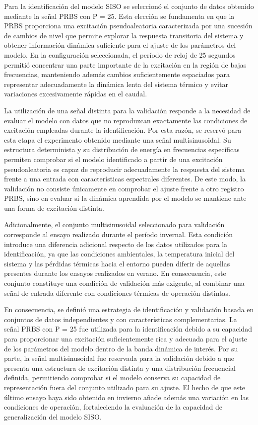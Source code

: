 \documentclass[11pt]{report}
\begin{document}
Para la identificación del modelo SISO se seleccionó el conjunto de datos obtenido mediante la señal PRBS con P = 25. Esta elección se fundamenta en que la PRBS proporciona una excitación pseudoaleatoria caracterizada por una sucesión de cambios de nivel que permite explorar la respuesta transitoria del sistema y obtener información dinámica suficiente para el ajuste de los parámetros del modelo. En la configuración seleccionada, el período de reloj de 25 segundos permitió concentrar una parte importante de la excitación en la región de bajas frecuencias, manteniendo además cambios suficientemente espaciados para representar adecuadamente la dinámica lenta del sistema térmico y evitar variaciones excesivamente rápidas en el caudal.

La utilización de una señal distinta para la validación responde a la necesidad de evaluar el modelo con datos que no reproduzcan exactamente las condiciones de excitación empleadas durante la identificación. Por esta razón, se reservó para esta etapa el experimento obtenido mediante una señal multisinusoidal. Su estructura determinista y su distribución de energía en frecuencias específicas permiten comprobar si el modelo identificado a partir de una excitación pseudoaleatoria es capaz de reproducir adecuadamente la respuesta del sistema frente a una entrada con características espectrales diferentes. De este modo, la validación no consiste únicamente en comprobar el ajuste frente a otro registro PRBS, sino en evaluar si la dinámica aprendida por el modelo se mantiene ante una forma de excitación distinta.

Adicionalmente, el conjunto multisinusoidal seleccionado para validación corresponde al ensayo realizado durante el período invernal. Esta condición introduce una diferencia adicional respecto de los datos utilizados para la identificación, ya que las condiciones ambientales, la temperatura inicial del sistema y las pérdidas térmicas hacia el entorno pueden diferir de aquellas presentes durante los ensayos realizados en verano. En consecuencia, este conjunto constituye una condición de validación más exigente, al combinar una señal de entrada diferente con condiciones térmicas de operación distintas.

En consecuencia, se definió una estrategia de identificación y validación basada en conjuntos de datos independientes y con características complementarias. La señal PRBS con P = 25 fue utilizada para la identificación debido a su capacidad para proporcionar una excitación suficientemente rica y adecuada para el ajuste de los parámetros del modelo dentro de la banda dinámica de interés. Por su parte, la señal multisinusoidal fue reservada para la validación debido a que presenta una estructura de excitación distinta y una distribución frecuencial definida, permitiendo comprobar si el modelo conserva su capacidad de representación fuera del conjunto utilizado para su ajuste. El hecho de que este último ensayo haya sido obtenido en invierno añade además una variación en las condiciones de operación, fortaleciendo la evaluación de la capacidad de generalización del modelo SISO.
\end{document}
